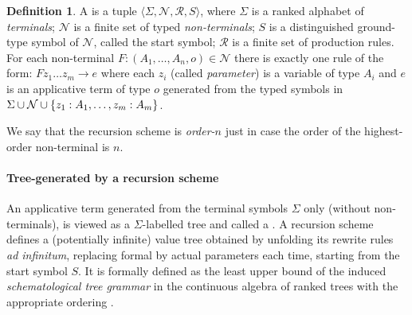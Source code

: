 \documentclass[a4paper]{article}[12pt]
\theoremstyle{remark}
\theoremstyle{definition}
\newtheorem{definition}{Definition}[section]
\begin{document}
\begin{definition}
	A  is a tuple $\langle
	\Sigma, \mathcal{N}, \mathcal{R}, S \rangle$, where $\Sigma$ is a
		ranked alphabet of \emph{terminals};
		$\mathcal{N}$ is a finite set of typed \emph{non-terminals};
		$S$ is a distinguished ground-type symbol of
		$\mathcal{N}$, called the start symbol;
		$\mathcal{R}$ is a finite set of production rules.
		For each non-terminal $F : (A_1, \ldots, A_n, o) \in \mathcal{N}$ there is exactly one rule of the form:
		$ F z_1 \ldots z_m \rightarrow e$
		where each $z_i$ (called \emph{parameter}) is a
		variable of type $A_i$ and $e$ is an applicative term of type $o$
		generated from the typed symbols in $\Sigma \cup \mathcal{N} \cup \{z_1:A_1, \ldots, z_m:A_m \}$.

	We say that the recursion scheme is \emph{order-$n$} just in case the order of the highest-order non-terminal is $n$.

\end{definition}

\paragraph{Tree-generated by a recursion scheme}
An applicative term generated from the terminal symbols $\Sigma$ only (without non-terminals), is viewed as a $\Sigma$-labelled tree and called a . A recursion scheme defines a (potentially infinite) value tree obtained by unfolding its rewrite rules \emph{ad infinitum}, replacing formal by actual parameters each time, starting from the start symbol $S$. It is formally defined as the least upper bound of the
induced \emph{schematological tree grammar} in the continuous algebra of ranked trees with the appropriate ordering \cite{KNU02,demirandathesis}.
\end{document}
